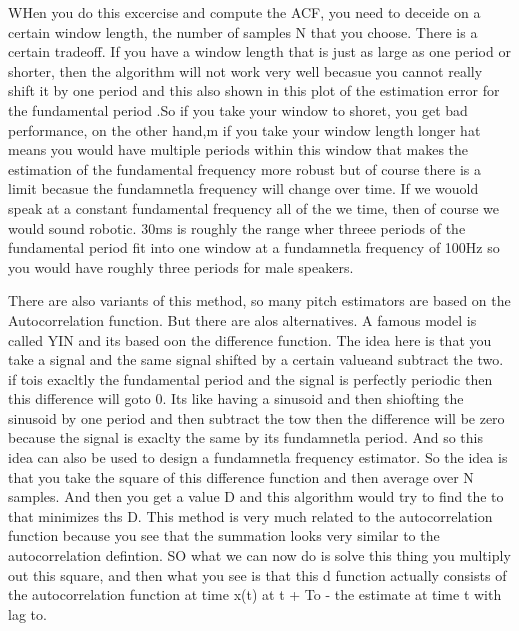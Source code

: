 WHen you do this excercise and compute the ACF, you need to deceide on a certain window length, the number of samples N that you choose. There is a certain tradeoff. If you have a window length that is just as large as one period or shorter, then the algorithm will not work very well becasue you cannot really shift it by one period and this also shown in this plot of the estimation error for the fundamental period .So if you take your window to shoret, you get bad performance, on the other hand,m if you take your window length longer hat means you would have multiple periods within this window that makes the estimation of the fundamental frequency more robust but of course there is a limit becasue the fundamnetla frequency will change over time. If we wouold speak at a constant fundamental frequency all of the we  time, then of course we would sound robotic. 30ms is roughly the range wher threee periods of the fundamental period fit into one window at a fundamnetla frequency of 100Hz so you would have roughly three periods for male speakers. 

There are also variants of this method, so many pitch estimators are based on the Autocorrelation function. But there are alos alternatives.  A famous model is called YIN and its based oon the difference function.  The idea here is that you take a signal and the same signal shifted by a certain valueand subtract the two. if tois exacltly the fundamental period and the signal is perfectly periodic then this difference will goto 0. Its like having a sinusoid and then shiofting the sinusoid by one period and then subtract the tow then the difference will be zero because the signal is exaclty the same by its fundamnetla period. And so this idea can also be used to design a fundamnetla frequency estimator. So the idea is that you take the square of this difference function and then average over N samples.  And then you get a value D and this algorithm would try to find the to that minimizes ths D.  This method is very much related to the autocorrelation function because you see that the summation looks very similar to the autocorrelation defintion. SO what we can now do is solve this thing you multiply out this square, and then what you see is that this d function actually consists of the autocorrelation function at time  x(t) at t + To - the estimate at time t with lag to.


